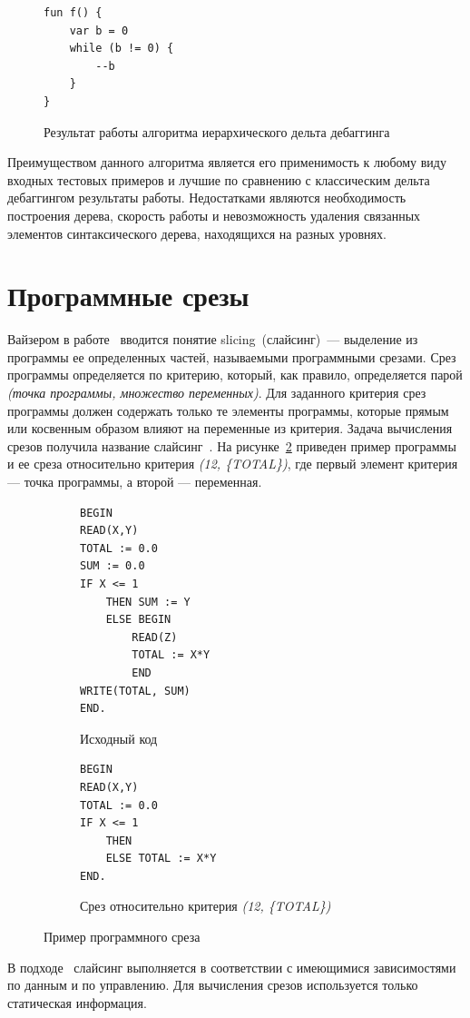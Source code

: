 \begin{figure}
\begin{lstlisting}
fun f() {
    var b = 0
    while (b != 0) {
        --b
    }
}
\end{lstlisting}
\caption{\label{ex2:hdd}Результат работы алгоритма иерархического дельта дебаггинга}
\end{figure}

Преимуществом данного алгоритма является его применимость к любому виду входных тестовых примеров и лучшие по сравнению с классическим дельта дебаггингом результаты работы. Недостатками являются необходимость построения дерева, скорость работы и невозможность удаления связанных элементов синтаксического дерева, находящихся на разных уровнях.

\section{Программные срезы}\label{slicing}
Вайзером в работе~\cite{weiser1981program} вводится понятие slicing~(слайсинг)~--- выделение из программы ее определенных частей, называемыми программными срезами. Срез программы определяется по критерию, который, как правило, определяется парой \textit{(точка программы, множество переменных)}. Для заданного критерия срез программы должен содержать только те элементы программы, которые прямым или косвенным образом влияют на переменные из критерия. Задача вычисления срезов получила название слайсинг~\cite{2002slicing}. На рисунке~\ref{ex:slice} приведен пример программы и ее среза относительно критерия \textit{(12, \{TOTAL\})},  где первый элемент критерия --- точка программы, а второй --- переменная.
%
\begin{figure}[]
\centering
\begin{subfigure}[t]{\linewidth}
\begin{lstlisting}[style = pascal]
BEGIN
READ(X,Y)
TOTAL := 0.0
SUM := 0.0
IF X <= 1
	THEN SUM := Y
	ELSE BEGIN
		READ(Z)
		TOTAL := X*Y
		END
WRITE(TOTAL, SUM)
END.
\end{lstlisting}
\caption{Исходный код}
\end{subfigure}
\begin{subfigure}[t]{\linewidth}
\begin{lstlisting}[style = pascal]
BEGIN
READ(X,Y)
TOTAL := 0.0
IF X <= 1
	THEN 
	ELSE TOTAL := X*Y
END.
\end{lstlisting}
\caption{Срез относительно критерия \textit{(12, \{TOTAL\})}}
\end{subfigure}

\caption{Пример программного среза}
\label{ex:slice}
\end{figure}
%
В подходе~\cite{weiser1981program} слайсинг выполняется в соответствии с имеющимися зависимостями по данным и по управлению. Для вычисления срезов используется только статическая информация. 

